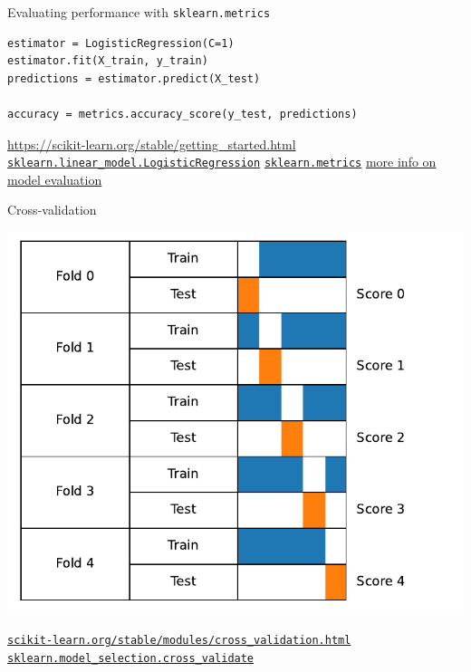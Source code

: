 \documentclass[presentation,mathserif,table]{beamer}
\begin{document}
\begin{frame}[label={sec:orgef1e5b2},fragile]{Evaluating performance with \texttt{sklearn.metrics}}
 \begin{verbatim}
estimator = LogisticRegression(C=1)
estimator.fit(X_train, y_train)
predictions = estimator.predict(X_test)

accuracy = metrics.accuracy_score(y_test, predictions)
\end{verbatim}
\vfill
\url{https://scikit-learn.org/stable/getting\_started.html}
\href{https://scikit-learn.org/stable/modules/generated/sklearn.linear\_model.LogisticRegression.html}{\texttt{sklearn.linear\_model.LogisticRegression}}
\href{https://scikit-learn.org/stable/modules/classes.html\#module-sklearn.metrics}{\texttt{sklearn.metrics}}
\href{https://scikit-learn.org/stable/modules/model\_evaluation.html\#the-scoring-parameter-defining-model-evaluation-rules}{more info on model evaluation}
\end{frame}
\begin{frame}[label={sec:org3906275},fragile]{Cross-validation}
 \begin{center}
\includegraphics[height=.7 \textheight]{cv_figure_simple.pdf}
\end{center}

\href{https://scikit-learn.org/stable/modules/cross\_validation.html}{\texttt{scikit-learn.org/stable/modules/cross\_validation.html}}
\href{https://scikit-learn.org/stable/modules/generated/sklearn.model\_selection.GridSearchCV.html}{\texttt{sklearn.model\_selection.cross\_validate}}
\end{frame}
\end{document}
